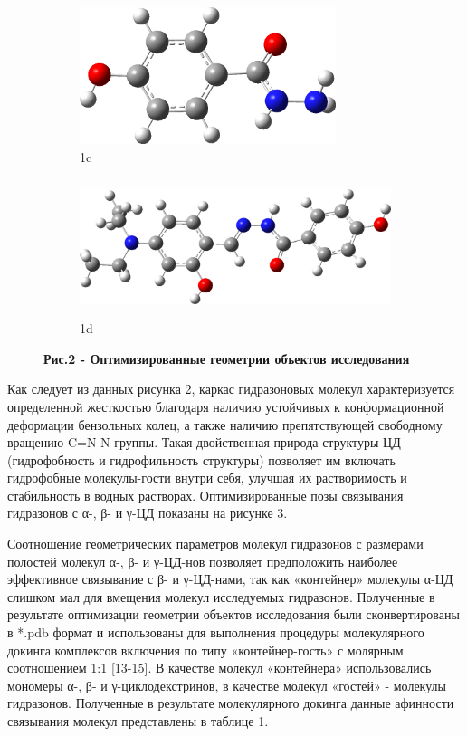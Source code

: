 \begin{figure}[H]
    \begin{subfigure}[t]{0.35\textwidth}
        \centering
        \includegraphics[width=\textwidth, height=4cm]{media/chem2/image33}
        \caption*{1c}
    \end{subfigure}
    \hfill
    \begin{subfigure}[t]{0.55\textwidth}
        \centering
        \includegraphics[width=\textwidth, height=4cm]{media/chem2/image34}
        \caption*{1d}
    \end{subfigure}
    \caption*{{\bfseries Рис.2 - Оптимизированные геометрии объектов исследования}}
\end{figure}

\begin{multicols}{2}
Как следует из данных рисунка 2, каркас гидразоновых молекул
характеризуется определенной жесткостью благодаря наличию устойчивых к
конформационной деформации бензольных колец, а также наличию
препятствующей свободному вращению C=N-N-группы. Такая двойственная
природа структуры ЦД (гидрофобность и гидрофильность структуры)
позволяет им включать гидрофобные молекулы-гости внутри себя, улучшая их
растворимость и стабильность в водных растворах. Оптимизированные позы
связывания гидразонов с α-, β- и γ-ЦД показаны на рисунке 3.

Соотношение геометрических параметров молекул гидразонов с размерами
полостей молекул α-, β- и γ-ЦД-нов позволяет предположить наиболее
эффективное связывание с β- и γ-ЦД-нами, так как «контейнер» молекулы
α-ЦД слишком мал для вмещения молекул исследуемых гидразонов. Полученные
в результате оптимизации геометрии объектов исследования были
сконвертированы в *.pdb формат и использованы для выполнения процедуры
молекулярного докинга комплексов включения по типу «контейнер-гость» с
молярным соотношением 1:1 {[}13-15{]}. В качестве молекул «контейнера»
использовались мономеры α-, β- и γ-циклодекстринов, в качестве молекул
«гостей» - молекулы гидразонов. Полученные в результате молекулярного
докинга данные афинности связывания молекул представлены в таблице 1.
\end{multicols}

